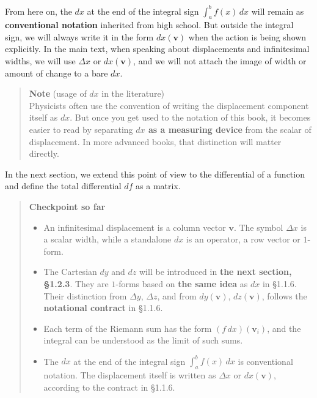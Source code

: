\documentclass[a4paper,12pt,openany]{book}
\begin{document}
From here on, the \(dx\) at the end of the integral sign
\(\int_a^b f(x)\,dx\) will remain as \textbf{conventional notation}
inherited from high school. But outside the integral sign, we will
always write it in the form \(dx(\mathbf{v})\) when the action is being
shown explicitly. In the main text, when speaking about displacements
and infinitesimal widths, we will use \(\Delta x\) or
\(dx(\mathbf{v})\), and we will not attach the image of width or amount
of change to a bare \(dx\).

\begin{quote}
\textbf{Note} (usage of \(dx\) in the literature)\\
Physicists often use the convention of writing the displacement
component itself as \(dx\). But once you get used to the notation of
this book, it becomes easier to read by separating
\textbf{$dx$ as a measuring device} from the scalar of displacement. In
more advanced books, that distinction will matter directly.
\end{quote}

In the next section, we extend this point of view to the differential of
a function and define the total differential \(df\) as a matrix.

\par\vspace{0.35em}\par

\begin{quote}
\textbf{Checkpoint so far}

\begin{itemize}
\item
  An infinitesimal displacement is a column vector \(\mathbf{v}\). The
  symbol \(\Delta x\) is a scalar width, while a standalone \(dx\) is an
  operator, a row vector or \(1\)-form.
\item
  The Cartesian \(dy\) and \(dz\) will be introduced in
  \textbf{the next section, §1.2.3}. They are \(1\)-forms based on
  \textbf{the same idea} as \(dx\) in §1.1.6. Their distinction from
  \(\Delta y\), \(\Delta z\), and from \(dy(\mathbf{v})\),
  \(dz(\mathbf{v})\), follows the \textbf{notational contract} in
  §1.1.6.
\item
  Each term of the Riemann sum has the form \((f\,dx)(\mathbf{v}_i)\),
  and the integral can be understood as the limit of such sums.
\item
  The \(dx\) at the end of the integral sign \(\int_a^b f(x)\,dx\) is
  conventional notation. The displacement itself is written as
  \(\Delta x\) or \(dx(\mathbf{v})\), according to the contract in
  §1.1.6.
\end{itemize}
\end{quote}
\end{document}
